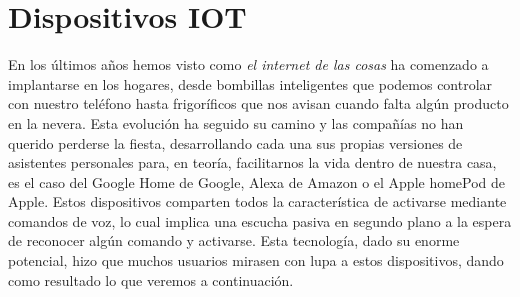 \documentclass[12pt,a4paper,oneside]{book} %
\begin{document}
\section{Dispositivos IOT}
En los últimos años hemos visto como \textit{el internet de las cosas} ha comenzado a implantarse en los hogares, desde bombillas inteligentes que podemos controlar con nuestro teléfono hasta frigoríficos que nos avisan cuando falta algún producto en la nevera. 
\newline \newline 
Esta evolución ha seguido su camino y las compañías no han querido perderse la fiesta, desarrollando cada una sus propias versiones de asistentes personales para, en teoría, facilitarnos la vida dentro de nuestra casa, es el caso del Google Home de Google, Alexa de Amazon o el Apple homePod de Apple. Estos dispositivos comparten todos la característica de  activarse mediante comandos de voz, lo cual implica una escucha pasiva en segundo plano a la espera de reconocer algún comando y activarse. 
\newline \newline 
Esta tecnología, dado su enorme potencial, hizo que muchos usuarios mirasen con lupa a estos dispositivos, dando como resultado lo que veremos a continuación. 
\end{document}
